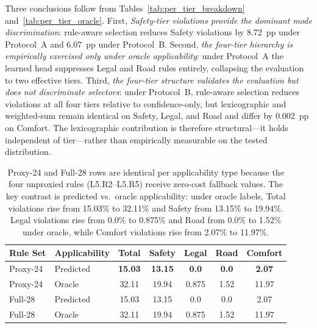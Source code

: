 Three conclusions follow from Tables~\ref{tab:per_tier_breakdown} and~\ref{tab:per_tier_oracle}.  First, \emph{Safety-tier violations provide the dominant mode discrimination}: rule-aware selection reduces Safety violations by 8.72~pp under Protocol~A and 6.07~pp under Protocol~B.  Second, \emph{the four-tier hierarchy is empirically exercised only under oracle applicability}: under Protocol~A the learned head suppresses Legal and Road rules entirely, collapsing the evaluation to two effective tiers.  Third, \emph{the four-tier structure validates the evaluation but does not discriminate selectors}: under Protocol~B, rule-aware selection reduces violations at all four tiers relative to confidence-only, but lexicographic and weighted-sum remain identical on Safety, Legal, and Road and differ by 0.002~pp on Comfort.  The lexicographic contribution is therefore structural---it holds independent of tier---rather than empirically measurable on the tested distribution.

\begin{table}[t]
\centering
\caption{Protocol Matrix: Violation Rates (\%) under Four Evaluation Configurations (12{,}800 Scenarios, Lexicographic Selection)}
\label{tab:protocol_matrix}
\setlength{\tabcolsep}{3pt}
\begin{tabular}{llccccc}
\toprule
\textbf{Rule Set} & \textbf{Applicability} & \textbf{Total} & \textbf{Safety} & \textbf{Legal} & \textbf{Road} & \textbf{Comfort} \\
\midrule
Proxy-24 & Predicted & \textbf{15.03} & \textbf{13.15} & \textbf{0.0} & \textbf{0.0} & \textbf{2.07} \\
Proxy-24 & Oracle    & 32.11 & 19.94 & 0.875 & 1.52 & 11.97 \\
\midrule
Full-28  & Predicted & 15.03 & 13.15 & 0.0 & 0.0 & 2.07 \\
Full-28  & Oracle    & 32.11 & 19.94 & 0.875 & 1.52 & 11.97 \\
\bottomrule
\end{tabular}
\vspace{1mm}
\caption*{\footnotesize Proxy-24 and Full-28 rows are identical per applicability type because the four unproxied rules (L5.R2--L5.R5) receive zero-cost fallback values.  The key contrast is predicted vs.\ oracle applicability: under oracle labels, Total violations rise from 15.03\% to 32.11\% and Safety from 13.15\% to 19.94\%.  Legal violations rise from 0.0\% to 0.875\% and Road from 0.0\% to 1.52\% under oracle, while Comfort violations rise from 2.07\% to 11.97\%.}
\end{table}

